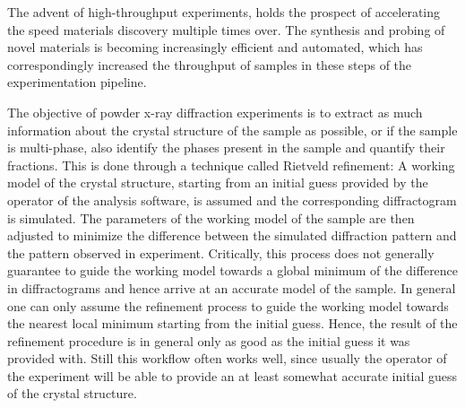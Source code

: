 



The advent of high-throughput experiments, holds the prospect of accelerating the speed materials discovery multiple times over.
The synthesis and probing of novel materials is becoming increasingly efficient and automated,
which has correspondingly increased the throughput of samples in these steps of the experimentation pipeline.




The objective of powder x-ray diffraction experiments is to extract as much information about the crystal structure
of the sample as possible, or if the sample is multi-phase, also identify the phases present in the sample and quantify
their fractions.
This is done through a technique called Rietveld refinement: A working model of the crystal structure, starting
from an initial guess provided by the operator of the analysis software, is assumed and the corresponding diffractogram
is simulated.
The parameters of the working model of the sample are then adjusted to minimize the difference between the simulated
diffraction pattern and the pattern observed in experiment.
Critically, this process does not generally guarantee to guide the working model towards a global minimum of the difference
in diffractograms and hence arrive at an accurate model of the sample.
In general one can only assume the refinement process to guide the working model towards the nearest local minimum
starting from the initial guess.
Hence, the result of the refinement procedure is in general only as good as the initial guess it was provided with.
Still this workflow often works well, since usually the operator of the experiment will be able
to provide an at least somewhat accurate initial guess of the crystal structure.\\

